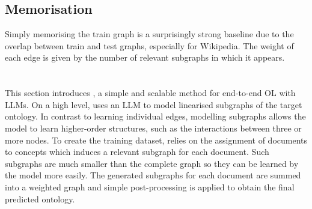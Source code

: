 \subsection{Memorisation}
Simply memorising the train graph is a surprisingly strong baseline due to the overlap between train and test graphs, especially for Wikipedia. The weight of each edge is given by the number of relevant subgraphs in which it appears.



\section{\name}  \label{sec:implementation:core}

This section introduces \name, a simple and scalable method for end-to-end OL with LLMs. On a high level, \name uses an LLM to model linearised subgraphs of the target ontology. In contrast to learning individual edges, modelling subgraphs allows the model to learn higher-order structures, such as the interactions between three or more nodes. To create the training dataset, \name relies on the assignment of documents to concepts which induces a relevant subgraph for each document. Such subgraphs are much smaller than the complete graph so they can be learned by the model more easily. The generated subgraphs for each document are summed into a weighted graph and simple post-processing is applied to obtain the final predicted ontology.


